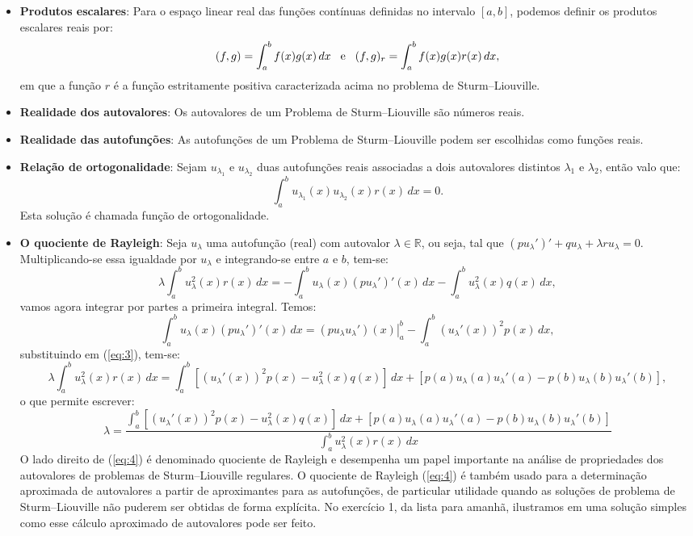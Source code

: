\documentclass[10pt,a4paper]{article}
\begin{document}
	\begin{itemize}
		\item \textbf{Produtos escalares}: Para o espaço linear real das funções contínuas definidas no intervalo $[a,b]$, podemos definir os produtos escalares reais por: \[(f,g) = \int_a^b f(x)g(x)\,dx \hspace{.3cm}\text{e}\hspace{.3cm}(f,g)_r = \int_a^bf(x)g(x)r(x)\,dx,\] em que a função $r$ é a função estritamente positiva caracterizada acima no problema de Sturm--Liouville.
		\item \textbf{Realidade dos autovalores}: Os autovalores de um Problema de Sturm--Liouville são números reais.
		\item \textbf{Realidade das autofunções}: As autofunções de um Problema de Sturm--Liouville podem ser escolhidas como funções reais.
		\item \textbf{Relação de ortogonalidade}: Sejam $u_{\lambda_1}$ e $u_{\lambda_2}$ duas autofunções reais associadas a dois autovalores distintos $\lambda_1$ e $\lambda_2$, então valo que: \[\int_a^b u_{\lambda_1}(x)u_{\lambda_2}(x)r(x)\,dx = 0.\] Esta solução é chamada função de ortogonalidade.
		\item \textbf{O quociente de Rayleigh}: Seja $u_\lambda$ uma autofunção (real) com autovalor $\lambda\in\mathbb{R}$, ou seja, tal que $(pu_\lambda')'+qu_\lambda+\lambda ru_\lambda = 0$. Multiplicando-se essa igualdade por $u_\lambda$ e integrando-se entre $a$ e $b$, tem-se:
		\begin{equation}
			\lambda\int_a^b u_\lambda^2(x)r(x)\,dx = -\int_a^bu_\lambda(x)(pu_\lambda')'(x)\,dx - \int_a^bu_\lambda^2(x)q(x)\,dx,
			\label{eq:3}
		\end{equation}
		vamos agora integrar por partes a primeira integral. Temos: \[\int_a^bu_\lambda(x)(pu_\lambda')'(x)\,dx = \left. (pu_\lambda u_\lambda')(x) \right|_a^b - \int_a^b(u_\lambda'(x))^2p(x)\,dx,\] substituindo em (\ref{eq:3}), tem-se: \[\lambda\int_a^b u_\lambda^2(x)r(x)\,dx = \int_a^b\left[(u_\lambda'(x))^2p(x)-u_\lambda^2(x)q(x)\right]\,dx + \left[p(a)u_\lambda(a)u_\lambda'(a)-p(b)u_\lambda(b)u_\lambda'(b)\right],\]
		o que permite escrever:
		\begin{equation}
			\lambda = \frac{\int_a^b\left[(u_\lambda'(x))^2p(x)-u_\lambda^2(x)q(x)\right]\,dx + \left[p(a)u_\lambda(a)u_\lambda'(a)-p(b)u_\lambda(b)u_\lambda'(b)\right]}{\int_a^b u_\lambda^2(x)r(x)\,dx}
			\label{eq:4}
		\end{equation}
		O lado direito de (\ref{eq:4}) é denominado quociente de Rayleigh e desempenha um papel importante na análise de propriedades dos autovalores de problemas de Sturm--Liouville regulares. O quociente de Rayleigh (\ref{eq:4}) é também usado para a determinação aproximada de autovalores a partir de aproximantes para as autofunções, de particular utilidade quando as soluções de problema de Sturm--Liouville não puderem ser obtidas de forma explícita. No exercício 1, da lista para amanhã, ilustramos em uma solução simples como esse cálculo aproximado de autovalores pode ser feito.
	\end{itemize}
	
\end{document}

